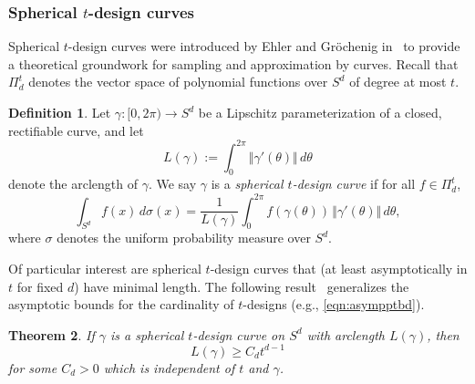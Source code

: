 \documentclass[12pt]{article}
\theoremstyle{plain}
\newtheorem{thm}{Theorem}
\theoremstyle{definition}
\newtheorem{defn}[thm]{Definition}
\theoremstyle{remark}
\newcommand{\norm}[1]{\Vert#1\Vert}
\newcommand{\rar}{\rightarrow}
\begin{document}
\subsubsection{Spherical $t$-design curves}
Spherical $t$-design curves were introduced by Ehler and Gr\"ochenig in~\cite{EhlerG:23} to provide a theoretical groundwork for sampling and approximation by curves.
Recall that $\Pi_d^t$ denotes the vector space of polynomial functions over $S^d$ of degree at most $t$.

\begin{defn}
Let $\gamma\colon [0,2 \pi)\rar S^d$ be a Lipschitz parameterization of a closed, rectifiable curve, and let
\[
L(\gamma) 
:= \int_0^{2\pi} \norm{\gamma'(\theta)} \,d\theta
\]
denote the arclength of $\gamma$.
We say $\gamma$ is a \emph{spherical $t$-design curve} if for all $f \in \Pi_d^t$,
    \[
    \int_{S^d} f(x)\, d\sigma(x) = \frac{1}{L(\gamma)}\int_0^{2\pi} f(\gamma(\theta)) \, \norm{\gamma'(\theta)} \,d\theta,
    \]
where $\sigma$ denotes the uniform probability measure over $S^d$.
\end{defn}

Of particular interest are spherical $t$-design curves that (at least asymptotically in $t$ for fixed $d$) have minimal length.  
The following result~\cite{EhlerG:23} generalizes the asymptotic bounds for the cardinality of $t$-designs (e.g., \eqref{eqn:asympptbd}).

\begin{thm}\label{thm:asymplength}
    If $\gamma$ is a spherical $t$-design curve on $S^d$ with arclength $L(\gamma)$, then
    \[
    L(\gamma) \geq C_d t^{d-1}
    \]
    for some $C_d>0$ which is independent of $t$ and $\gamma$.
\end{thm}
\end{document}
